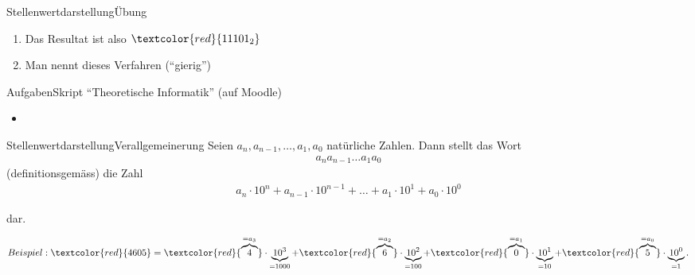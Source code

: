 \begin{frame}{Stellenwertdarstellung}{Übung}
\begin{enumerate}
{\begin{align*}
        \textcolor{red}{a_3}\cdot \underbrace{2^3}_{=8} + 
        \textcolor{red}{a_2}\cdot \underbrace{2^2}_{=4} +
        \textcolor{red}{a_1}\cdot \underbrace{2^1}_{=2} + 
        \textcolor{red}{a_0}\cdot \underbrace{2^0}_{=1}.
    \end{align*}
    }
    \item<7-> Das Resultat ist also $\textcolor{red}{11101_2}$
    \item<8-> Man nennt dieses Verfahren  (``gierig'')
    
    
\end{enumerate}
\end{frame}

\begin{frame}{Aufgaben}{Skript ``Theoretische Informatik'' (auf Moodle)}
\begin{itemize}
    \item {}
\end{itemize}
\end{frame}


\begin{frame}{Stellenwertdarstellung}{Verallgemeinerung}
    Seien $a_n,a_{n-1},\ldots,a_1,a_0$ natürliche Zahlen. Dann stellt das Wort
    \begin{align*}
        a_na_{n-1}\ldots a_1a_0
    \end{align*}
    (definitionsgemäss) die Zahl
    \begin{align*}
        a_n\cdot 10^n + a_{n-1}\cdot 10^{n-1}+\ldots + a_1\cdot 10^1 + a_0\cdot 10^0
    \end{align*}

    dar.

    
\begin{align*}
    Beispiel: \textcolor{red}{4605} = \textcolor{red}{\overbrace{4}^{=a_3}}\cdot \underbrace{10^3}_{=1000} + \textcolor{red}{\overbrace{6}^{=a_2}}\cdot \underbrace{10^2}_{=100} + \textcolor{red}{\overbrace{0}^{=a_1}}\cdot \underbrace{10^1}_{=10} + \textcolor{red}{\overbrace{5}^{=a_0}}\cdot \underbrace{10^0}_{=1}.
\end{align*}

\end{frame}




